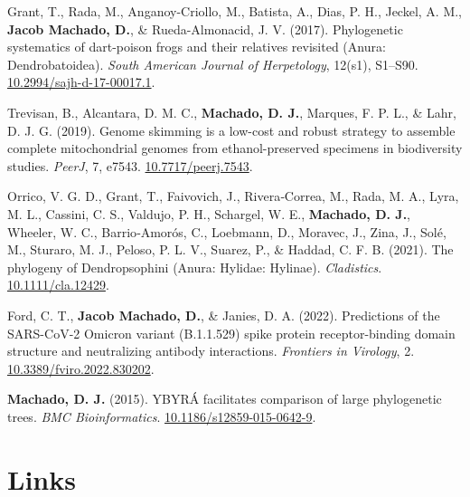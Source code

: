 \documentclass[11pt, letterpaper, sans]{moderncv}
\begin{document}
\begin{hangparas}{.2in}{1}
    Grant, T., Rada, M., Anganoy-Criollo, M., Batista, A., Dias, P. H., Jeckel, A. M., \textbf{Jacob Machado, D.}, \& Rueda-Almonacid, J. V. (2017). Phylogenetic systematics of dart-poison frogs and their relatives revisited (Anura: Dendrobatoidea). \textit{South American Journal of Herpetology}, 12(s1), S1--S90. \href{https://doi.org/10.2994/sajh-d-17-00017.1}{10.2994/sajh-d-17-00017.1}.
    
    Trevisan, B., Alcantara, D. M. C., \textbf{Machado, D. J.}, Marques, F. P. L., \& Lahr, D. J. G. (2019). Genome skimming is a low-cost and robust strategy to assemble complete mitochondrial genomes from ethanol-preserved specimens in biodiversity studies. \textit{PeerJ}, 7, e7543. \href{https://doi.org/10.7717/peerj.7543}{10.7717/peerj.7543}.
    
    Orrico, V. G. D., Grant, T., Faivovich, J., Rivera‐Correa, M., Rada, M. A., Lyra, M. L., Cassini, C. S., Valdujo, P. H., Schargel, W. E., \textbf{Machado, D. J.}, Wheeler, W. C., Barrio‐Amorós, C., Loebmann, D., Moravec, J., Zina, J., Solé, M., Sturaro, M. J., Peloso, P. L. V., Suarez, P., \& Haddad, C. F. B. (2021). The phylogeny of Dendropsophini (Anura: Hylidae: Hylinae). \textit{Cladistics}. \href{https://doi.org/10.1111/cla.12429}{10.1111/cla.12429}.
    
    Ford, C. T., \textbf{Jacob Machado, D.}, \& Janies, D. A. (2022). Predictions of the SARS-CoV-2 Omicron variant (B.1.1.529) spike protein receptor-binding domain structure and neutralizing antibody interactions. \textit{Frontiers in Virology}, 2. \href{https://doi.org/10.3389/fviro.2022.830202}{10.3389/fviro.2022.830202}.
    
    \textbf{Machado, D. J.} (2015). YBYRÁ facilitates comparison of large phylogenetic trees. \textit{BMC Bioinformatics}. \href{https://doi.org/10.1186/s12859-015-0642-9}{10.1186/s12859-015-0642-9}.
    
    \end{hangparas}


\section{Links}
\end{document}
